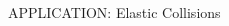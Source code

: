 \documentclass{summarysheet}
\begin{document}
\begin{multicols}{2}
\begin{topicbox}{APPLICATION: Elastic Collisions}
\end{topicbox}






\end{multicols}



\end{document}
